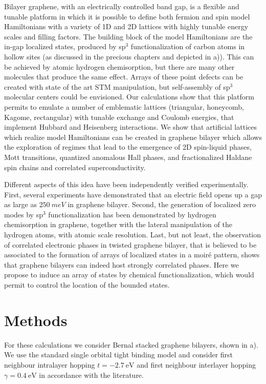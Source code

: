 Bilayer graphene, with an electrically controlled band gap, is a flexible and tunable platform in which it is possible to define both fermion and spin model Hamiltonians with a variety of 1D and 2D lattices with highly tunable energy scales and filling factors.
The building block of the model Hamiltonians are the in-gap localized states, produced by sp$^3$ functionalization of carbon atoms in hollow sites (as discussed in the precious chapters and depicted in a)). This can be achieved by atomic hydrogen chemisorption\cite{Brihuega2016}, but there are many other molecules that produce the same effect\cite{Santos2012a}.
Arrays of these point defects can be created with state of the art STM manipulation,\cite{Brihuega2016} but self-assembly of sp$^3$ molecular centers could be envisioned.
Our calculations show that this platform permits to emulate a number of emblematic lattices (triangular, honeycomb, Kagome, rectangular)
with tunable exchange and Coulomb energies, that implement Hubbard and Heisenberg interactions. %
We show that artificial lattices which realize model Hamiltonians can be created in graphene bilayer which allows the exploration of regimes that lead to the emergence of 2D spin-liquid phases, Mott transitions, quantized anomalous Hall phases, and fractionalized Haldane spin chains and correlated superconductivity. 
 
Different aspects of this idea have been independently verified experimentally. First, several experiments have demonstrated that an electric field opens up a gap as large as $\SI{250}{meV}$ in graphene bilayer\cite{Castro2007, Zhang2009, Taychatanapat2010}. Second, the generation of localized zero modes by sp$^3$ functionalization has been demonstrated by hydrogen chemisorption in graphene\cite{Brihuega2016}, together with the lateral manipulation of the hydrogen atoms, with atomic scale resolution\cite{Ugeda2011,Brihuega2016}. Last, but not least, the observation of correlated electronic phases in twisted graphene bilayer\cite{Cao2018a, Cao2018b}, %
that is believed to be associated to the formation of arrays of localized states in a moiré pattern\cite{}, shows that graphene bilayers can indeed host strongly correlated phases.
Here we propose to induce an array of states by chemical functionalization, which would permit to control the location of the bounded states. 
 
\section{Methods}
For these calculations we consider Bernal stacked graphene bilayers, shown in a). We use the standard single orbital tight binding model\cite{McCann2012} and consider first neighbour intralayer hopping $t=\SI{-2.7}{\eV}$ and first neighbour interlayer hopping $\gamma=\SI{0.4}{\eV}$ in accordance with the literature\cite{KatsnelsonBook}.

